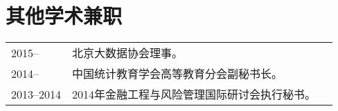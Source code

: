 \documentclass[twoside,a4paper,10pt]{amsart}
\begin{document}
\section*{其他学术兼职}
\begin{tabular}{l p{} l}


  2015-- & 北京大数据协会理事。\\

  2014-- & 中国统计教育学会高等教育分会副秘书长。\\

  2013--2014 & 2014年金融工程与风险管理国际研讨会执行秘书。\\

\end{tabular}


\end{document}
